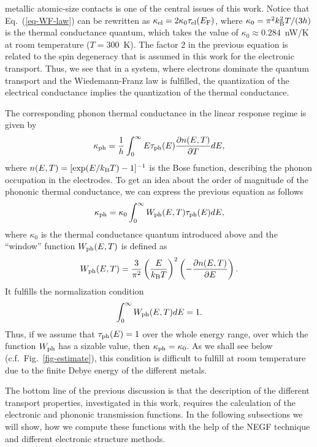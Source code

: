 \documentclass[aps,amsmath,amssymb,twocolumn,showpacs]{revtex4-1}
\begin{document}
 metallic atomic-size contacts is one of the central issues of this
 work. Notice that Eq.~(\ref{eq-WF-law}) can be rewritten as $\kappa_{\rm el}
 = 2 \kappa_0 \tau_{\rm el}(E_{\rm F})$, where $\kappa_0 = \pi^2 k^2_{\rm B}
 T/(3h)$ is the thermal conductance quantum, which takes the value of
 $\kappa_0 \approx 0.284$~nW/K at room temperature ($T=300$~K). The factor 2 in
 the previous equation is related to the spin degeneracy that is assumed in
 this work for the electronic transport. Thus, we see that in a system, where
 electrons dominate the quantum transport and the Wiedemann-Franz law is
 fulfilled, the quantization of the electrical conductance implies the
 quantization of the thermal conductance.
  
The corresponding phonon thermal conductance in the linear response regime is
given by \cite{Rego1998,Mingo2003,Yamamoto2006}
%
\begin{equation}
\kappa_{\rm ph} = \frac{1}{h} \int_{0}^{\infty} E \tau_{\rm ph}(E) 
\frac{\partial n(E,T)}{\partial T} dE, 
\label{eq-kph}
\end{equation}
%
where $n(E,T)=[\exp(E/k_{\rm B}T)-1]^{-1}$ is the Bose function, describing
the phonon occupation in the electrodes. To get an idea about the order of
magnitude of the phononic thermal conductance, we can express the previous
equation as follows
%
\begin{equation}
\kappa_{\rm ph} = \kappa_0 \int_{0}^{\infty} W_{\rm ph}(E,T) \tau_{\rm ph}(E) dE, 
\label{eq-kph2}
\end{equation}
%      
where $\kappa_0$ is the thermal conductance quantum introduced above and the
``window'' function $W_{\rm ph}(E,T)$ is defined as
%
\begin{equation}
W_{\rm ph}(E,T) = \frac{3}{\pi^2} \left( \frac{E}{k_{\rm B} T}\right)^2 
\left( - \frac{\partial n(E,T)}{\partial E} \right).  
\label{eq-Wph}
\end{equation}
%      
It fulfills the normalization condition
%
\begin{equation}
  \int_{0}^{\infty} W_{\rm ph}(E,T) dE = 1.
\end{equation}
%
Thus, if we assume that $\tau_{\rm ph}(E) = 1$ over the whole energy range,
over which the function $W_{\rm ph}$ has a sizable value, then $\kappa_{\rm ph} 
= \kappa_0$. As we shall see below (c.f.\ Fig.~\ref{fig-estimate}), this 
condition is difficult to fulfill at room temperature due to the finite Debye 
energy of the different metals.

The bottom line of the previous discussion is that the description of the
different transport properties, investigated in this work, requires the
calculation of the electronic and phononic transmission functions. In the
following subsections we will show, how we compute these functions with the
help of the NEGF technique and different electronic structure methods.
\end{document}
